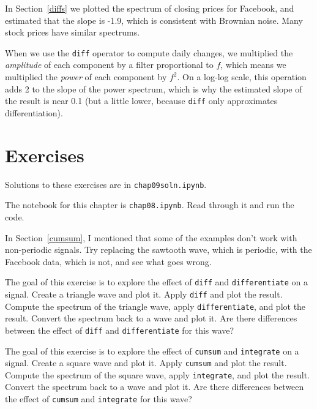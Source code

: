 \documentclass[12pt]{book}
\begin{document}
In Section~\ref{diffs} we plotted the spectrum of closing prices for
Facebook, and estimated that the slope is -1.9, which is consistent
with Brownian noise.  Many stock prices have similar spectrums.

When we use the {\tt diff} operator to compute daily changes, we
multiplied the {\em amplitude} of each component by a filter proportional to
$f$, which means we multiplied the {\em power} of each component by $f^2$.
On a log-log scale, this operation adds 2 to the slope of the
power spectrum, which is why the estimated slope of the result
is near 0.1 (but a little lower, because {\tt diff} only approximates
differentiation).



\section{Exercises}

Solutions to these exercises are in {\tt chap09soln.ipynb}.

\begin{exercise}
The notebook for this chapter is {\tt chap08.ipynb}.
Read through it and run the code.

In Section~\ref{cumsum}, I mentioned that some of the
examples don't work with non-periodic signals.  Try replacing the
sawtooth wave, which is periodic, with the Facebook data, which is
not, and see what goes wrong.
\end{exercise}

\begin{exercise}
The goal of this exercise is to explore the effect of {\tt diff} and
{\tt differentiate} on a signal. Create a triangle wave and plot
it. Apply {\tt diff} and plot the result. Compute the spectrum of the
triangle wave, apply {\tt differentiate}, and plot the result. Convert
the spectrum back to a wave and plot it. Are there differences between
the effect of {\tt diff} and {\tt differentiate} for this wave?
\end{exercise}

\begin{exercise}
The goal of this exercise is to explore the effect of {\tt cumsum} and
{\tt integrate} on a signal. Create a square wave and plot it. Apply
{\tt cumsum} and plot the result. Compute the spectrum of the square
wave, apply {\tt integrate}, and plot the result. Convert the spectrum
back to a wave and plot it. Are there differences between the effect
of {\tt cumsum} and {\tt integrate} for this wave?
\end{exercise}
\end{document}
